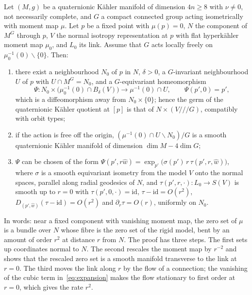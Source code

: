 \begin{theorem}\label{thm:normal-form}
Let $(M,g)$ be a quaternionic K\"ahler manifold of dimension $4n\ge8$ with $\nu\neq0$, not
necessarily complete, and $G$ a compact connected group acting isometrically with moment map
$\mu$. Let $p$ be a fixed point with $\mu(p)=0$, $N$ the component of $M^G$ through $p$, $V$ the
normal isotropy representation at $p$ with flat hyperk\"ahler moment map $\mu_0$, and $L_0$ its
link. Assume that $G$ acts locally freely on $\mu_0^{-1}(0)\smallsetminus\{0\}$. Then:
\begin{enumerate}
\item there exist a neighbourhood $N_0$ of $p$ in $N$, $\delta>0$, a $G$-invariant
 neighbourhood $U$ of $p$ with $U\cap M^G=N_0$, and a $G$-equivariant homeomorphism
 \begin{equation}
  \Psi:N_0\times\bigl(\mu_0^{-1}(0)\cap B_\delta(V)\bigr)\longrightarrow\mu^{-1}(0)\cap U,
  \qquad \Psi(p',0)=p',
  \label{eq:normal-form}
 \end{equation}
 which is a diffeomorphism away from $N_0\times\{0\}$; hence the germ of the quaternionic
 K\"ahler quotient at $[p]$ is that of $N\times(V/\!/\!/G)$, compatibly with orbit types;
\item if the action is free off the origin, $(\mu^{-1}(0)\cap U\smallsetminus N_0)/G$ is a smooth
 quaternionic K\"ahler manifold of dimension $\dim M-4\dim G$;
\item $\Psi$ can be chosen of the form
 $\Psi(p',r\hat w)=\exp_{p'}\bigl(\sigma(p')\,r\,\tau(p',r,\hat w)\bigr)$, where $\sigma$ is a
 smooth equivariant isometry from the model $V$ onto the normal spaces, parallel along radial
 geodesics of $N$, and $\tau(p',r,\cdot):L_0\to S(V)$ is smooth up to $r=0$ with
 $\tau(p',0,\cdot)=\mathrm{id}$, $\tau-\mathrm{id}=O(r^2)$, $D_{(p',\hat w)}(\tau-\mathrm{id})=O(r^2)$
 and $\partial_r\tau=O(r)$, uniformly on $N_0$.
\end{enumerate}
\end{theorem}

In words: near a fixed component with vanishing moment map, the zero set of $\mu$ is a bundle
over $N$ whose fibre is the zero set of the rigid model, bent by an amount of order $r^2$ at
distance $r$ from $N$. The proof has three steps. The first sets up coordinates normal to $N$.
The second rescales the moment map by $r^{-2}$ and shows that the rescaled zero set is a smooth
manifold transverse to the link at $r=0$. The third moves the link along $r$ by the flow of a
connection; the vanishing of the cubic term in~\eqref{eq:expansion} makes the flow stationary to
first order at $r=0$, which gives the rate $r^2$.


